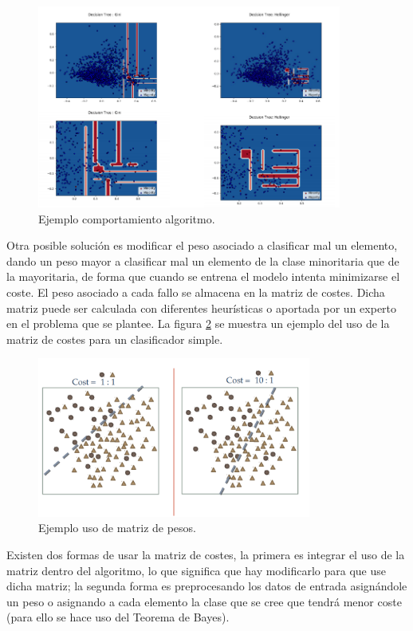 \begin{figure}[h]
	\centering
	\includegraphics[width=100mm]{imagenes/hellinger-example.png}
	\caption{Ejemplo comportamiento algoritmo.}
	\label{fig:25}
\end{figure}
\verticalspace

Otra posible solución es modificar el peso asociado a clasificar mal un elemento, dando un peso mayor a clasificar mal un elemento de la clase minoritaria que de la mayoritaria, de forma que cuando se entrena el modelo intenta minimizarse el coste. El peso asociado a cada fallo se almacena en la matriz de costes. Dicha matriz puede ser calculada con diferentes heurísticas o aportada por un experto en el problema que se plantee. La figura \ref{fig:26} se muestra un ejemplo del uso de la matriz de costes para un clasificador simple.\newline

\begin{figure}[h]
	\centering
	\includegraphics[width=90mm]{imagenes/cost-sentitive.png}
	\caption{Ejemplo uso de matriz de pesos.}
	\label{fig:26}
\end{figure}
\verticalspace

Existen dos formas de usar la matriz de costes, la primera es integrar el uso de la matriz dentro del algoritmo, lo que significa que hay modificarlo para que use dicha matriz; la segunda forma es preprocesando los datos de entrada asignándole un peso o asignando a cada elemento la clase que se cree que tendrá menor coste (para ello se hace uso del Teorema de Bayes).

